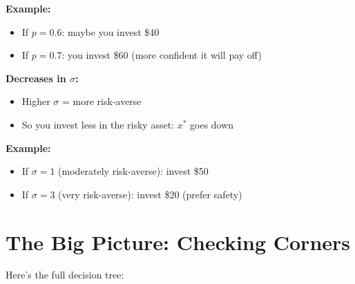 \documentclass[12pt]{article}
\begin{document}
\textbf{Example:}
\begin{itemize}
\item If $p = 0.6$: maybe you invest \$40
\item If $p = 0.7$: you invest \$60 (more confident it will pay off)
\end{itemize}

\vspace{0.3cm}

\textbf{Decreases in $\sigma$:}
\begin{itemize}
\item Higher $\sigma$ = more risk-averse
\item So you invest less in the risky asset: $x^*$ goes down
\end{itemize}

\textbf{Example:}
\begin{itemize}
\item If $\sigma = 1$ (moderately risk-averse): invest \$50
\item If $\sigma = 3$ (very risk-averse): invest \$20 (prefer safety)
\end{itemize}

\newpage

\section*{The Big Picture: Checking Corners}

Here's the full decision tree:
\end{document}
